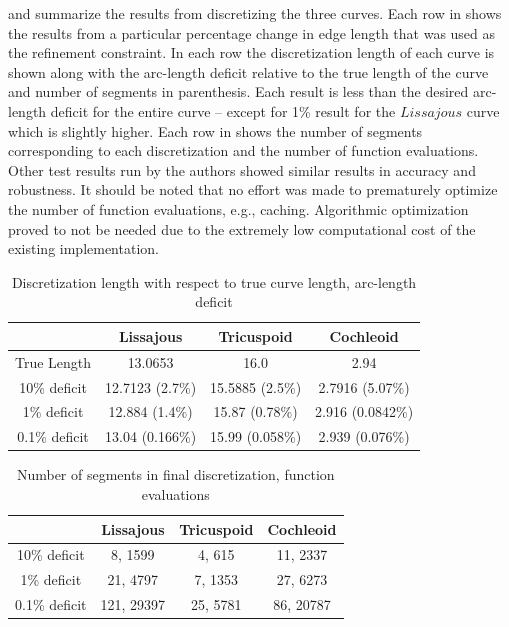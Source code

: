  and  summarize the results from discretizing the three curves. 
Each row in  shows the results from a particular percentage change in edge length that was 
used as the refinement constraint. In each row the discretization 
length of each curve is shown along with the arc-length deficit relative 
to the true length of the curve and number of segments in parenthesis. 
Each result is less than the desired arc-length deficit for the entire 
curve -- except for 1\% result for the $Lissajous$ curve which is slightly 
higher. Each row in  shows the number of segments 
corresponding to each discretization and the number of function 
evaluations. Other test results run by the authors showed similar results 
in accuracy and robustness. It should be noted that no effort was made to 
prematurely optimize the number of function evaluations, e.g., caching. 
Algorithmic optimization proved to not be needed due to the 
extremely low computational cost of the existing implementation.

\begin{table}[h!] \caption{\label{tab:curvelength} Discretization length with respect to true curve length, arc-length deficit }
\centering
\begin{tabular}{|c|c|c|c|}
\hline
 & Lissajous & Tricuspoid & Cochleoid \\
\hline
True Length & 13.0653 & 16.0 & 2.94\\
10\% deficit & 12.7123 (2.7\%) & 15.5885 (2.5\%) & 2.7916 (5.07\%)\\
1\% deficit & 12.884 (1.4\%) & 15.87 (0.78\%) & 2.916 (0.0842\%)\\
0.1\% deficit & 13.04 (0.166\%) & 15.99 (0.058\%) & 2.939 (0.076\%)\\
\hline
\end{tabular}
\end{table}

\begin{table}[h!] \caption{\label{tab:generationdata} Number of segments in final discretization, function evaluations }
\centering
\begin{tabular}{|c|c|c|c|}
\hline
 & Lissajous & Tricuspoid & Cochleoid \\
\hline
10\% deficit & 8, 1599 & 4, 615 & 11, 2337 \\
1\% deficit & 21, 4797 & 7, 1353 & 27, 6273 \\ 
0.1\% deficit & 121, 29397 & 25, 5781 & 86, 20787 \\ 
\hline
\end{tabular}
\end{table}
